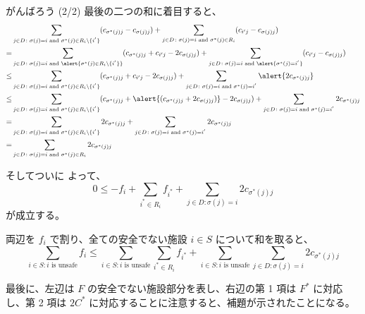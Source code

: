 \documentclass[aspectratio=169]{beamer}
\begin{document}
\begin{frame}{がんばろう (2/2)}
  最後の二つの和に着目すると、
  \small{
    \begin{align*}
          & \sum_{j \in D \colon \sigma(j) = i \text{ and } \sigma^*(j) \in R_i \setminus\{i^{'}\}} (c_{\sigma^*(j)j} - c_{\sigma(j)j}) + \sum_{j \in D \colon \sigma(j) = i \text{ and } \sigma^*(j) \in R_i} (c_{i'j} - c_{\sigma(j)j})                                        \\
      =   & \sum_{j \in D \colon \sigma(j) = i \text{ and } \alert{\sigma^*(j) \in R_i \setminus\{i^{'}\}}} (c_{\sigma^*(j)j} + c_{i'j} - 2c_{\sigma(j)j}) + \sum_{j \in D \colon \sigma(j) = i \text{ and } \alert{\sigma^*(j) = i^{'}}} (c_{i'j} - c_{\sigma(j)j})             \\
      \le & \sum_{j \in D \colon \sigma(j) = i \text{ and } \sigma^*(j) \in R_i \setminus\{i^{'}\}} (c_{\sigma^*(j)j} + c_{i'j} - 2c_{\sigma(j)j}) + \sum_{j \in D \colon \sigma(j) = i \text{ and } \sigma^*(j) = i^{'}} \alert{2c_{\sigma^*(j)j}}                              \\
      \le & \sum_{j \in D \colon \sigma(j) = i \text{ and } \sigma^*(j) \in R_i \setminus\{i^{'}\}} (c_{\sigma^*(j)j} + \alert{(c_{\sigma^*(j)j} + 2c_{\sigma(j)j})} - 2c_{\sigma(j)j}) + \sum_{j \in D \colon \sigma(j) = i \text{ and } \sigma^*(j) = i^{'}} 2c_{\sigma^*(j)j} \\
      =   & \sum_{j \in D \colon \sigma(j) = i \text{ and } \sigma^*(j) \in R_i \setminus\{i^{'}\}} 2c_{\sigma^*(j)j} + \sum_{j \in D \colon \sigma(j) = i \text{ and } \sigma^*(j) = i^{'}} 2c_{\sigma^*(j)j}                                                                   \\
      =   & \sum_{j \in D \colon \sigma(j) = i \text{ and } \sigma^*(j) \in R_i} 2c_{\sigma^*(j)j}
    \end{align*}
  }
\end{frame}

\begin{frame}{そしてついに}
  よって、
  \[
    0 \le - f_i + \sum_{i^* \in R_i} f_{i^*} + \sum_{j \in D \colon \sigma(j) = i} 2c_{\sigma^*(j)j}
  \]
  が成立する。

  両辺を \(f_i\) で割り、全ての安全でない施設 \(i \in S\) について和を取ると、
  \[
    \sum_{i \in S \colon i \text{ is unsafe}} f_i \le \sum_{i \in S \colon i \text{ is unsafe}} \sum_{i^* \in R_i} f_{i^*} + \sum_{i \in S \colon i \text{ is unsafe}} \sum_{j \in D \colon \sigma(j) = i} 2c_{\sigma^*(j)j}
  \]

  最後に、左辺は \(F\) の安全でない施設部分を表し、右辺の第 1 項は \(F^*\) に対応し、第 2 項は \(2C^*\) に対応することに注意すると、補題が示されたことになる。
\end{frame}
\end{document}
